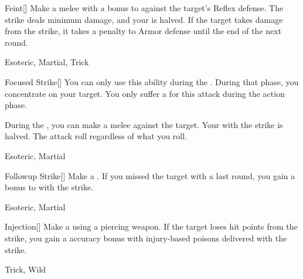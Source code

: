 \lowercase{\hypertarget{maneuver:Feint}{}}\label{maneuver:Feint}
\hypertarget{maneuver:Feint}{}
\begin{freeability}[Rank 2]{Feint}[]
Make a melee  with a  bonus to  against the target's Reflex defense.
The strike deals minimum damage, and your  is halved.
If the target takes damage from the strike, it takes a  penalty to Armor defense until the end of the next round.


 Esoteric, Martial, Trick
\end{freeability}
\vspace{0.25em}



\lowercase{\hypertarget{maneuver:Focused Strike}{}}\label{maneuver:Focused Strike}
\hypertarget{maneuver:Focused Strike}{}
\begin{freeability}[Rank 2]{Focused Strike}[]
You can only use this ability during the .
During that phase, you concentrate on your target.
You only suffer a  for this attack during the action phase.

During the , you can make a melee  against the target.
Your  with the strike is halved.
The attack roll  regardless of what you roll.


 Esoteric, Martial
\end{freeability}
\vspace{0.25em}



\lowercase{\hypertarget{maneuver:Followup Strike}{}}\label{maneuver:Followup Strike}
\hypertarget{maneuver:Followup Strike}{}
\begin{freeability}[Rank 2]{Followup Strike}[]
Make a .
If you missed the target with a  last round, you gain a  bonus to  with the strike.


 Esoteric, Martial
\end{freeability}
\vspace{0.25em}



\lowercase{\hypertarget{maneuver:Injection}{}}\label{maneuver:Injection}
\hypertarget{maneuver:Injection}{}
\begin{freeability}[Rank 2]{Injection}[]
Make a  using a piercing weapon.
If the target loses hit points from the strike, you gain a  accuracy bonus with injury-based poisons delivered with the strike.


 Trick, Wild
\end{freeability}
\vspace{0.25em}



